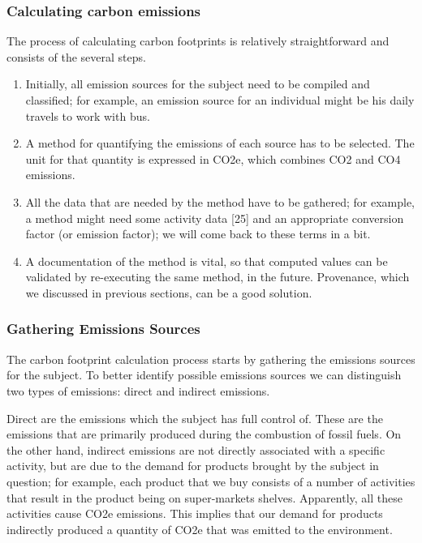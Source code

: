 \subsubsection{Calculating carbon emissions}

The process of calculating carbon footprints is relatively straightforward and consists of the several steps.

\begin{enumerate}
  \item 
        Initially, all emission sources for the subject need to be compiled and classified; for example, an emission source for an individual might be his daily travels to work with bus.
  \item 
        A method for quantifying the emissions of each source has to be selected. The unit for that quantity is expressed in CO2e, which combines CO2 and CO4 emissions.
  \item 
        All the data that are needed by the method have to be gathered; for example, a method might need some activity data [25] and an appropriate conversion factor (or emission factor); we will come back to these terms in a bit.
  \item 
        A documentation of the method is vital, so that computed values can be validated by re-executing the same method, in the future. Provenance, which we discussed in previous sections, can be a good solution.
\end{enumerate}


\subsubsection{Gathering Emissions Sources}

The carbon footprint calculation process starts by gathering the emissions sources for the subject. To better identify possible emissions sources we can distinguish two types of emissions: direct and indirect emissions.

Direct are the emissions which the subject has full control of. These are the emissions that are primarily produced during the combustion of fossil fuels. On the other hand, indirect emissions are not directly associated with a specific activity, but are due to the demand for products brought by the subject in question; for example, each product that we buy consists of a number of activities that result in the product being on super-markets shelves. Apparently, all these activities cause CO2e emissions. This implies that our demand for products indirectly produced a quantity of CO2e that was emitted to the environment.

